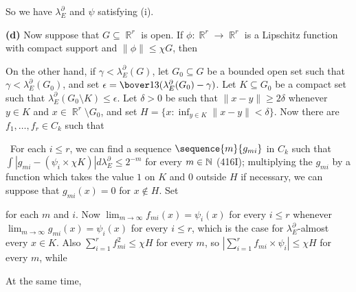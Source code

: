 {\noindent So we have $\lambda^{\partial}_E$ and $\psi$ satisfying (i).

\medskip

{\bf (d)} Now suppose that $G\subseteq\BbbR^r$ is open.   If
$\phi:\BbbR^r\to\BbbR^r$ is a Lipschitz function with compact support
and $\|\phi\|\le\chi G$, then


\noindent On the other hand, if $\gamma<\lambda^{\partial}_E(G)$, let
$G_0\subseteq G$ be a bounded open set such that
$\gamma<\lambda^{\partial}_E(G_0)$, and set
$\epsilon=\bover13(\lambda^{\partial}_E(G_0)-\gamma)$.   Let
$K\subseteq G_0$ be a compact set such that
$\lambda^{\partial}_E(G_0\setminus K)\le\epsilon$.   Let $\delta>0$ be
such that $\|x-y\|\ge 2\delta$ whenever $y\in K$ and
$x\in\BbbR^r\setminus G_0$, and set
$H=\{x:\inf_{y\in K}\|x-y\|<\delta\}$.
Now there are $f_1,\ldots,f_r\in C_k$ such that


\noindent\Prf\ For each $i\le r$, we can find a sequence
$\sequence{m}{g_{mi}}$ in $C_k$ such that
$\int|g_{mi}-(\psi_i\times\chi K)|d\lambda^{\partial}_E\le 2^{-m}$ for
every $m\in\Bbb N$ (416I);
multiplying the $g_{mi}$ by a function which takes the value $1$ on $K$
and $0$ outside $H$ if necessary, we can suppose that $g_{mi}(x)=0$ for
$x\notin H$.   Set


\noindent for each $m$ and $i$.   Now
$\lim_{m\to\infty}f_{mi}(x)=\psi_i(x)$ for every $i\le r$ whenever
$\lim_{m\to\infty}g_{mi}(x)=\psi_i(x)$ for every $i\le r$, which is the
case for $\lambda^{\partial}_E$-almost every $x\in K$.   Also
$\sum_{i=1}^rf_{mi}^2\le\chi H$ for every $m$, so
$|\sum_{i=1}^rf_{mi}\times\psi_i|\le\chi H$ for every $m$, while


\noindent At the same time,


}
